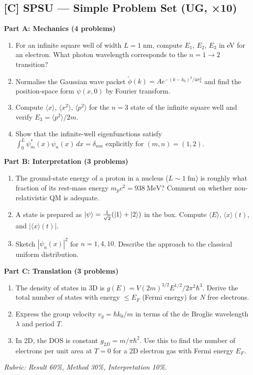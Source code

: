 \subsection*{[C] SPSU — Simple Problem Set (UG, ×10)}
\begin{tcolorbox}[ugprobbox, title={SPSU · L01 · Tiers 1–3 · 60–90 min}]

\textbf{Part A: Mechanics (4 problems)}
\begin{enumerate}[label=\textbf{P\arabic*.}]
  \item For an infinite square well of width $L=1\;\mathrm{nm}$, compute $E_1$, $E_2$, $E_3$
    in eV for an electron. What photon wavelength corresponds to the $n=1\to2$ transition?
  \item Normalise the Gaussian wave packet $\tilde{\phi}(k) = A e^{-(k-k_0)^2/4\sigma_k^2}$ and
    find the position-space form $\psi(x,0)$ by Fourier transform.
  \item Compute $\langle x\rangle$, $\langle x^2\rangle$, $\langle p^2\rangle$ for the $n=3$
    state of the infinite square well and verify $E_3 = \langle p^2\rangle/2m$.
  \item Show that the infinite-well eigenfunctions satisfy
    $\int_0^L \psi_m^*(x)\psi_n(x)\,dx = \delta_{mn}$ explicitly for $(m,n) = (1,2)$.
\end{enumerate}

\textbf{Part B: Interpretation (3 problems)}
\begin{enumerate}[label=\textbf{P\arabic*.},resume]
  \item The ground-state energy of a proton in a nucleus ($L \sim 1\;\mathrm{fm}$) is roughly
    what fraction of its rest-mass energy $m_p c^2 = 938\;\mathrm{MeV}$?
    Comment on whether non-relativistic QM is adequate.
  \item A state is prepared as $\ket{\psi} = \frac{1}{\sqrt{2}}(\ket{1}+\ket{2})$ in the box.
    Compute $\langle E\rangle$, $\langle x\rangle(t)$, and $|\langle x\rangle(t)|$.
  \item Sketch $|\psi_n(x)|^2$ for $n=1,4,10$. Describe the approach to the classical
    uniform distribution.
\end{enumerate}

\textbf{Part C: Translation (3 problems)}
\begin{enumerate}[label=\textbf{P\arabic*.},resume]
  \item The density of states in 3D is $g(E) = V(2m)^{3/2}E^{1/2}/2\pi^2\hbar^3$.
    Derive the total number of states with energy $\leq E_F$ (Fermi energy) for $N$ free electrons.
  \item Express the group velocity $v_g = \hbar k_0/m$ in terms of the de Broglie wavelength $\lambda$ and period $T$.
  \item In 2D, the DOS is constant $g_{2D} = m/\pi\hbar^2$. Use this to find the number of
    electrons per unit area at $T=0$ for a 2D electron gas with Fermi energy $E_F$.
\end{enumerate}
\textit{Rubric: Result 60\%, Method 30\%, Interpretation 10\%.}
\end{tcolorbox}

